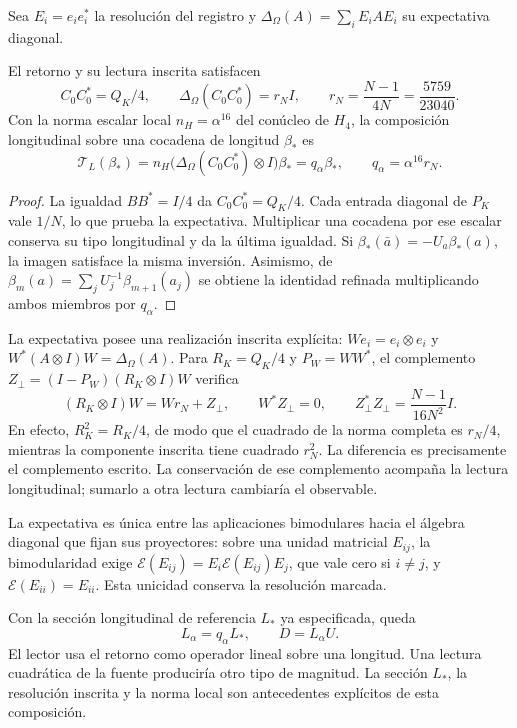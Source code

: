 Sea $E_i=e_ie_i^*$ la resolución del registro y
$\Delta_\Omega(A)=\sum_iE_iAE_i$ su expectativa diagonal.

\begin{lemma}
\label{md:rigidez:retorno}
El retorno y su lectura inscrita satisfacen
\[
 C_0C_0^*=Q_K/4,\qquad
 \Delta_\Omega(C_0C_0^*)=r_NI,\qquad
 r_N=\frac{N-1}{4N}=\frac{5759}{23040}.
\]
Con la norma escalar local $n_H=\alpha^{16}$ del conúcleo de $H_4$,
la composición longitudinal sobre una cocadena de longitud $\beta_*$ es
\[
 \mathscr T_L(\beta_*)=
 n_H\bigl(\Delta_\Omega(C_0C_0^*)\otimes I\bigr)\beta_*
 =q_\alpha\beta_*,
 \qquad q_\alpha=\alpha^{16}r_N.
 \label{md:rigidez:qalpha}
\]
\end{lemma}
\begin{proof}
La igualdad $BB^*=I/4$ da $C_0C_0^*=Q_K/4$. Cada entrada diagonal
de $P_K$ vale $1/N$, lo que prueba la expectativa. Multiplicar una
cocadena por ese escalar conserva su tipo longitudinal y da la última
igualdad. Si $\beta_*(\bar a)=-U_a\beta_*(a)$, la imagen satisface la
misma inversión. Asimismo, de
$\beta_m(a)=\sum_jU_j^{-1}\beta_{m+1}(a_j)$ se obtiene la identidad
refinada multiplicando ambos miembros por $q_\alpha$.
\end{proof}

La expectativa posee una realización inscrita explícita:
$We_i=e_i\otimes e_i$ y
$W^*(A\otimes I)W=\Delta_\Omega(A)$. Para
$R_K=Q_K/4$ y $P_W=WW^*$, el complemento
$Z_\perp=(I-P_W)(R_K\otimes I)W$ verifica
\[
 (R_K\otimes I)W=Wr_N+Z_\perp,\qquad W^*Z_\perp=0,\qquad
 Z_\perp^*Z_\perp=\frac{N-1}{16N^2}I.
\]
En efecto, $R_K^2=R_K/4$, de modo que el cuadrado de la norma completa
es $r_N/4$, mientras la componente inscrita tiene cuadrado $r_N^2$.
La diferencia es precisamente el complemento escrito. La conservación de
ese complemento acompaña la lectura longitudinal; sumarlo a otra lectura
cambiaría el observable.

La expectativa es única entre las aplicaciones bimodulares hacia el
álgebra diagonal que fijan sus proyectores: sobre una unidad matricial
$E_{ij}$, la bimodularidad exige
$\mathcal E(E_{ij})=E_i\mathcal E(E_{ij})E_j$, que vale cero si $i\ne j$,
y $\mathcal E(E_{ii})=E_{ii}$. Esta unicidad conserva la resolución marcada.

Con la sección longitudinal de referencia $L_*$ ya especificada, queda
\begin{equation}
 L_\alpha=q_\alpha L_*,\qquad D=L_\alpha U.
 \label{md:rigidez:longitud-def}
\end{equation}
El lector usa el retorno como operador lineal sobre una longitud. Una
lectura cuadrática de la fuente produciría otro tipo de magnitud. La
sección $L_*$, la resolución inscrita y la norma local son antecedentes
explícitos de esta composición.

